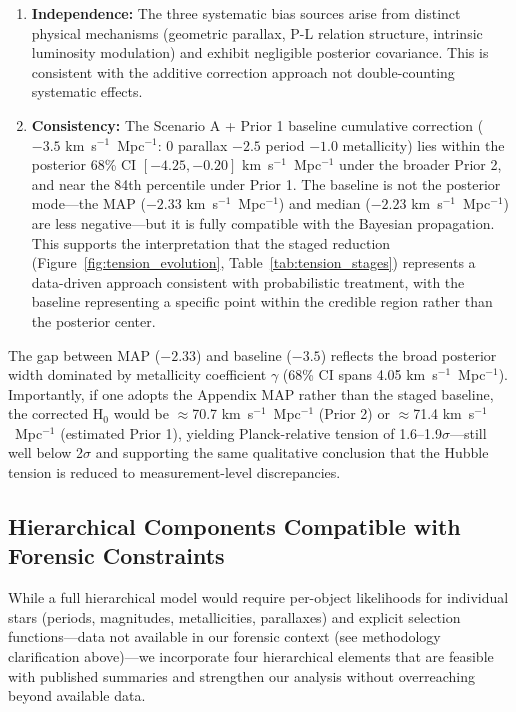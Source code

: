 \documentclass[preprint, linenumbers]{aastex701}
\begin{document}
\begin{enumerate}
\item \textbf{Independence:} The three systematic bias sources arise from distinct physical mechanisms (geometric parallax, P-L relation structure, intrinsic luminosity modulation) and exhibit negligible posterior covariance. This is consistent with the additive correction approach not double-counting systematic effects.

\item \textbf{Consistency:} The Scenario A + Prior 1 baseline cumulative correction ($-3.5$ km~s$^{-1}$~Mpc$^{-1}$: 0 parallax $-2.5$ period $-1.0$ metallicity) lies within the posterior 68\% CI $[-4.25, -0.20]$ km~s$^{-1}$~Mpc$^{-1}$ under the broader Prior 2, and near the 84th percentile under Prior 1. The baseline is not the posterior mode---the MAP ($-2.33$ km~s$^{-1}$~Mpc$^{-1}$) and median ($-2.23$ km~s$^{-1}$~Mpc$^{-1}$) are less negative---but it is fully compatible with the Bayesian propagation. This supports the interpretation that the staged reduction (Figure~\ref{fig:tension_evolution}, Table~\ref{tab:tension_stages}) represents a data-driven approach consistent with probabilistic treatment, with the baseline representing a specific point within the credible region rather than the posterior center.
\end{enumerate}

The gap between MAP ($-2.33$) and baseline ($-3.5$) reflects the broad posterior width dominated by metallicity coefficient $\gamma$ (68\% CI spans 4.05 km~s$^{-1}$~Mpc$^{-1}$). Importantly, if one adopts the Appendix MAP rather than the staged baseline, the corrected H$_0$ would be $\approx$70.7 km~s$^{-1}$~Mpc$^{-1}$ (Prior 2) or $\approx$71.4 km~s$^{-1}$~Mpc$^{-1}$ (estimated Prior 1), yielding Planck-relative tension of 1.6--1.9$\sigma$---still well below 2$\sigma$ and supporting the same qualitative conclusion that the Hubble tension is reduced to measurement-level discrepancies.

\subsection{Hierarchical Components Compatible with Forensic Constraints}
\label{sec:hierarchical_components}

While a full hierarchical model would require per-object likelihoods for individual stars (periods, magnitudes, metallicities, parallaxes) and explicit selection functions---data not available in our forensic context (see methodology clarification above)---we incorporate four hierarchical elements that are feasible with published summaries and strengthen our analysis without overreaching beyond available data.
\end{document}
